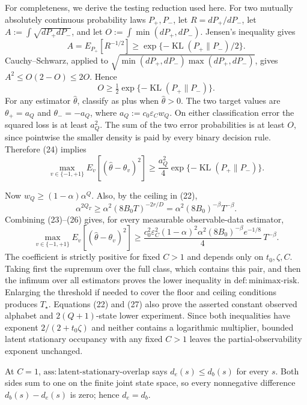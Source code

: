 For completeness, we derive the testing reduction used here.  For two mutually absolutely continuous probability laws \(P_+,P_-\), let \(R=dP_+/dP_-\), let
\(A:=\int\sqrt{dP_+dP_-}\), and let \(O:=\int\min(dP_+,dP_-)\).  Jensen's inequality gives
\[
 A=E_{P_+}[R^{-1/2}]
 \ge\exp\{-\operatorname{KL}(P_+\|P_-)/2\}.
\]
Cauchy--Schwarz, applied to \(\sqrt{\min(dP_+,dP_-)\max(dP_+,dP_-)}\), gives
\(A^2\le O(2-O)\le2O\).  Hence
\[
 O\ge\tfrac12\exp\{-\operatorname{KL}(P_+\|P_-)\}. \tag{24}
\]
For any estimator \(\widehat\theta\), classify as plus when \(\widehat\theta>0\).  The two target values are \(\theta_+=a_Q\) and \(\theta_-=-a_Q\), where
\(a_Q:=c_0\varepsilon_Cw_Q\).  On either classification error the squared loss is at least \(a_Q^2\).  The sum of the two error probabilities is at least \(O\), since pointwise the smaller density is paid by every binary decision rule.  Therefore (24) implies
\[
 \max_{v\in\{-1,+1\}}E_v[(\widehat\theta-\theta_v)^2]
 \ge\frac{a_Q^2}{4}\exp\{-\operatorname{KL}(P_+\|P_-)\}. \tag{25}
\]

Now \(w_Q\ge(1-\alpha)\alpha^Q\).  Also, by the ceiling in (22),
\[
 \alpha^{2Q_T}\ge \alpha^2(8B_0T)^{-2r/D}
 =\alpha^2(8B_0)^{-\beta}T^{-\beta}. \tag{26}
\]
Combining (23)--(26) gives, for every measurable observable-data estimator,
\[
 \max_{v\in\{-1,+1\}}E_v[(\widehat\theta-\theta_v)^2]
 \ge \frac{c_0^2\varepsilon_C^2(1-\alpha)^2\alpha^2
              (8B_0)^{-\beta}e^{-1/8}}{4}\,T^{-\beta}. \tag{27}
\]
The coefficient is strictly positive for fixed \(C>1\) and depends only on \(t_0,\zeta,C\).  Taking first the supremum over the full class, which contains this pair, and then the infimum over all estimators proves the lower inequality in \(\mathrm{def{:}minimax\text{-}risk}\).  Enlarging the threshold if needed to cover the floor and ceiling conditions produces \(T_\star\).  Equations (22) and (27) also prove the asserted constant observed alphabet and \(2(Q+1)\)-state lower experiment.  Since both inequalities have exponent \(2/(2+t_0\zeta)\) and neither contains a logarithmic multiplier, bounded latent stationary occupancy with any fixed \(C>1\) leaves the partial-observability exponent unchanged.

At \(C=1\), \(\mathrm{ass{:}latent\text{-}stationary\text{-}overlap}\) says \(d_e(s)\le d_b(s)\) for every \(s\).  Both sides sum to one on the finite joint state space, so every nonnegative difference \(d_b(s)-d_e(s)\) is zero; hence \(d_e=d_b\).

